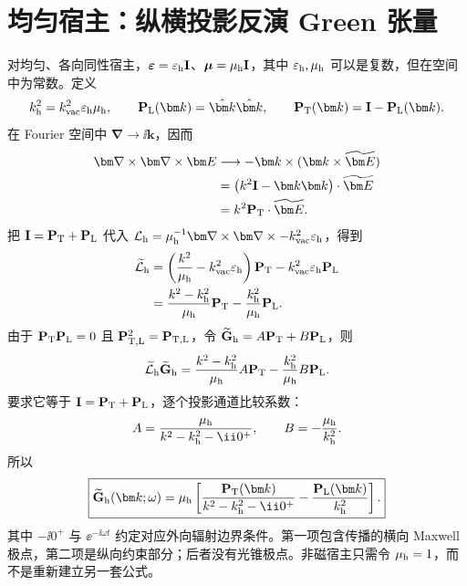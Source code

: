 \section{均匀宿主：纵横投影反演 Green 张量}

对均匀、各向同性宿主，$\boldsymbol\varepsilon=\varepsilon_{\rm h}\mathbf I$、$\boldsymbol\mu=\mu_{\rm h}\mathbf I$，其中 $\varepsilon_{\rm h},\mu_{\rm h}$ 可以是复数，但在空间中为常数。定义
\begin{equation}
 k_{\rm h}^2=k_{\rm vac}^2\varepsilon_{\rm h}\mu_{\rm h},
 \qquad
 \mathbf P_{\rm L}(\bm k)=\hat{\bm k}\hat{\bm k},
 \qquad
 \mathbf P_{\rm T}(\bm k)=\mathbf I-\mathbf P_{\rm L}(\bm k).
 \label{eq:LT-projectors}
\end{equation}
在 Fourier 空间中 $\bm\nabla\to\ii\bm k$，因而
\begin{align}
\bm\nabla\times\bm\nabla\times\bm E
&\longrightarrow
-\bm k\times(\bm k\times\widetilde{\bm E})\\
&=\left(k^2\mathbf I-\bm k\bm k\right)\cdot\widetilde{\bm E}\\
&=k^2\mathbf P_{\rm T}\cdot\widetilde{\bm E}.
\end{align}
把 $\mathbf I=\mathbf P_{\rm T}+\mathbf P_{\rm L}$ 代入
$\mathcal L_{\rm h}=\mu_{\rm h}^{-1}\bm\nabla\times\bm\nabla\times-k_{\rm vac}^2\varepsilon_{\rm h}$，得到
\begin{align}
\widetilde{\mathcal L}_{\rm h}
&=\left(\frac{k^2}{\mu_{\rm h}}-k_{\rm vac}^2\varepsilon_{\rm h}\right)\mathbf P_{\rm T}
-k_{\rm vac}^2\varepsilon_{\rm h}\mathbf P_{\rm L}\\
&=\frac{k^2-k_{\rm h}^2}{\mu_{\rm h}}\mathbf P_{\rm T}
-\frac{k_{\rm h}^2}{\mu_{\rm h}}\mathbf P_{\rm L}.
\label{eq:maxwell-LT-decomposition}
\end{align}
由于 $\mathbf P_{\rm T}\mathbf P_{\rm L}=0$ 且 $\mathbf P_{\rm T,L}^2=\mathbf P_{\rm T,L}$，令
$\widetilde{\mathbf G}_{\rm h}=A\mathbf P_{\rm T}+B\mathbf P_{\rm L}$，则
\begin{equation}
\widetilde{\mathcal L}_{\rm h}\widetilde{\mathbf G}_{\rm h}
=\frac{k^2-k_{\rm h}^2}{\mu_{\rm h}}A\mathbf P_{\rm T}
-\frac{k_{\rm h}^2}{\mu_{\rm h}}B\mathbf P_{\rm L}.
\end{equation}
要求它等于 $\mathbf I=\mathbf P_{\rm T}+\mathbf P_{\rm L}$，逐个投影通道比较系数：
\begin{equation}
 A=\frac{\mu_{\rm h}}{k^2-k_{\rm h}^2-\ii0^+},
 \qquad
 B=-\frac{\mu_{\rm h}}{k_{\rm h}^2}.
\end{equation}
所以
\begin{equation}
 \boxed{
 \widetilde{\mathbf G}_{\rm h}(\bm k;\omega)
 =\mu_{\rm h}\left[
 \frac{\mathbf P_{\rm T}(\bm k)}{k^2-k_{\rm h}^2-\ii0^+}
 -\frac{\mathbf P_{\rm L}(\bm k)}{k_{\rm h}^2}
 \right].}
 \label{eq:homogeneous-green-k}
\end{equation}
其中 $-\ii0^+$ 与 $\ee^{-\ii\omega t}$ 约定对应外向辐射边界条件。第一项包含传播的横向 Maxwell 极点，第二项是纵向约束部分；后者没有光锥极点。非磁宿主只需令 $\mu_{\rm h}=1$，而不是重新建立另一套公式。

